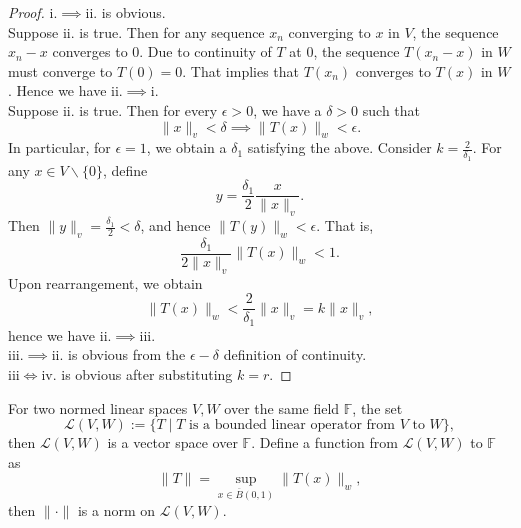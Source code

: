 \begin{proof}
    i.$\implies$ii. is obvious.\\ 
    Suppose ii. is true. Then for any sequence $x_{n}$ converging to $x$ in $V$, the sequence $x_{n}-x$ converges to $0$. Due to continuity of $T$ at $0$, the sequence $T(x_{n}-x)$ in $W$ must converge to $T(0)=0$. That implies that $T(x_{n})$ converges to $T(x)$ in $W$. Hence we have ii.$\implies$i.\\ 
    Suppose ii. is true. Then for every $\epsilon>0$, we have a $\delta>0$ such that $$\|x\|_{v}<\delta\implies\|T(x)\|_{w}<\epsilon.$$
    In particular, for $\epsilon = 1$, we obtain a $\delta_{1}$ satisfying the above. Consider $k=\frac{2}{\delta_{1}}$. For any $x\in V\backslash\{0\}$, define $$y=\frac{\delta_{1}}{2}\frac{x}{\|x\|_{v}}.$$
    Then $\|y\|_{v}=\frac{\delta_{1}}{2}<\delta$, and hence $\|T(y)\|_{w}<\epsilon$. That is, $$\frac{\delta_{1}}{2\|x\|_{v}}\|T(x)\|_{w}<1.$$
    Upon rearrangement, we obtain $$\|T(x)\|_{w}<\frac{2}{\delta_{1}}\|x\|_{v}=k\|x\|_{v},$$
    hence we have ii.$\implies$iii.\\ 
    iii.$\implies$ii. is obvious from the $\epsilon-\delta$ definition of continuity.\\
    iii$\iff$iv. is obvious after substituting $k=r$.
\end{proof}
\vspace{0.4cm}
\begin{definition}
    For two normed linear spaces $V,W$ over the same field $\mathbb{F}$, the set $$\mathscr{L}(V,W):=\{T\mid T\text{ is a bounded linear operator from }V\text{ to }W\},$$ then $\mathscr{L}(V,W)$ is a vector space over $\mathbb{F}$. Define a function from $\mathscr{L}(V,W)$ to $\mathbb{F}$ as $$\|T\|=\sup_{x\in\overline{B}(0,1)}\|T(x)\|_{w},$$ then $\|\cdot\|$ is a norm on $\mathscr{L}(V,W)$.
\end{definition}
\vspace{0.4cm}
